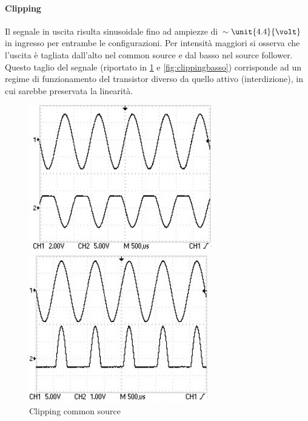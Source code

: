 \documentclass[10pt,a4paper]{article}
\begin{document}
 \paragraph{Clipping}
Il segnale in uscita risulta sinusoidale fino ad ampiezze di $\sim \unit{4.4}{\volt}$ in ingresso per entrambe le configurazioni.
Per intensità maggiori si osserva che l'uscita è tagliata dall'alto nel common source e dal basso nel source follower. Questo taglio del segnale (riportato in \figurename{\ref{fig:clippingalto}} e \figurename{\ref{fig:clippingbasso}}) corrisponde ad un regime di funzionamento del transistor diverso da quello attivo (interdizione), in cui sarebbe preservata la linearità.

\begin{figure}[h!]
	\centering
	\begin{minipage}{0.49\textwidth}
		\centering
		\includegraphics[width=\textwidth]{../oscilloscopio/clipalto.jpg}
		\caption{Clipping common source}                                                                          
			\label{fig:clippingalto}
	\end{minipage}
	\begin{minipage}{0.49\textwidth}
		\centering
		\includegraphics[width=\textwidth]{../oscilloscopio/clipbasso.jpg}

\end{minipage}
\end{figure}
\end{document}
